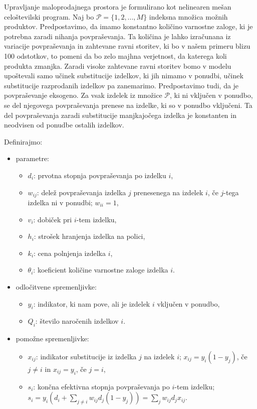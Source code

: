 \documentclass[a4paper]{article}
\begin{document}
Upravljanje maloprodajnega prostora je formulirano kot nelinearen mešan celoštevilski program. Naj bo $\mathcal{P}= \{1, 2, ..., M\}$ indeksna množica možnih produktov. Predpostavimo, da imamo konstantno količino varnostne zaloge, ki je potrebna zaradi nihanja povpraševanja. Ta količina je lahko izračunana iz variacije povpraševanja in zahtevane ravni storitev, ki bo v našem primeru blizu 100 odstotkov, to pomeni da bo zelo majhna verjetnost, da katerega koli produkta zmanjka. Zaradi visoke zahtevane ravni storitev bomo v modelu upoštevali samo učinek substitucije izdelkov, ki jih nimamo v ponudbi, učinek substitucije razprodanih izdelkov pa zanemarimo. Predpostavimo tudi, da je povpraševanje eksogeno. Za vsak izdelek iz množice  $\mathcal{P}$, ki ni vključen v ponudbo, se del njegovega povpraševanja prenese na izdelke, ki so v ponudbo vključeni. Ta del povpraševanja zaradi substitucije manjkajočega izdelka je konstanten in neodvisen od ponudbe ostalih izdelkov. 


Definirajmo:
\begin{itemize}
\item parametre:
\begin{itemize}
\item $ d_i $: prvotna stopnja povpraševanja po izdelku $i$,
\item $ w_{ij}$: delež povpraševanja izdelka $j$ prenesenega na izdelek $i$, če $j$-tega izdelka ni v ponudbi; $w_{ii} = 1$,
\item $ v_i $: dobiček pri $i$-tem izdelku,
\item $ h_i $: strošek hranjenja izdelka na polici,
\item $ k_i $: cena polnjenja izdelka $i$, 
\item $ \theta_i $: koeficient količine varnostne zaloge izdelka $i$.
\end{itemize}

\item odločitvene spremenljivke:
\begin{itemize}
\item $ y_i $: indikator, ki nam pove, ali je izdelek $i$ vključen v ponudbo,
\item $ Q_i $: število naročenih izdelkov $i$.
\end{itemize}

\item pomožne spremenljivke:
\begin{itemize}
\item $ x_{ij} $: indikator substitucije iz izdelka $j$ na izdelek $i$; $x_{ij} = y_i (1-y_j)$, če $j \ne i$ in $x_{ij} = y_i$, če  $j = i$,
\item $ s_i $: končna efektivna stopnja povpraševanja po $i$-tem izdelku; $s_i = y_i (d_i + \sum_{j \ne i} w_{ij} d_j (1-y_j)) = \sum_j  w_{ij} d_j x_{ij}.$
\end{itemize} 
\end{itemize}
\end{document}
